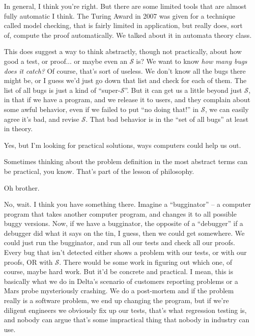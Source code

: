 \documentclass[sigplan]{acmart}
\begin{document}
   In general, I think you're right. But
there are some limited tools that are almost fully automatic I think.
The Turing Award in 2007 was given for a technique called model
checking, that is fairly limited in application, but really does, sort of,
compute the proof automatically.  We talked about it in automata
theory class.

  This does suggest a way to think
abstractly, though not practically, about how good a test, or proof...
or maybe even an $\mathcal{S}$ is?  We want to know \emph{how many bugs does
  it catch?}  Of course, that's sort of useless.  We don't know all
the bugs there might be, or I guess we'd just go down that list and
check for each of them.  The list of all bugs is just a kind of ``super-$\mathcal{S}$''.  But it can get us a little beyond just
$\mathcal{S}$, in that if we have a program, and we release it to
users, and they complain about some awful behavior, even if we failed
to put ``no doing that!'' in $\mathcal{S}$, we can easily agree it's
bad, and revise $\mathcal{S}$.  That bad behavior is in the ``set of
all bugs'' at least in theory.

  Yes, but I'm looking for practical
solutions, ways computers could help us out.

  Sometimes thinking about the problem
definition in the most abstract terms can be practical, you know.
That's part of the lesson of philosophy.

  Oh brother.

  No, wait.  I think you have something
there.  Imagine a ``bugginator'' -- a computer program that takes
another computer program, and changes it to all possible buggy
versions.  Now, if we have a bugginator, the opposite of a
``debugger'' if a debugger did what it says on the tin, I guess, then
we could get somewhere.  We could just run the bugginator, and run all
our tests and check all our proofs.  Every bug that isn't detected
either shows a problem with our tests, or with our proofs, OR with
$\mathcal{S}$.  There would be some work in figuring out which one, of
course, maybe hard work.  But it'd be concrete and practical.  I mean,
this is basically what we do in Delta's scenario of customers
reporting problems or a Mars probe mysteriously crashing.  We do a
post-mortem and if the problem really is a software problem, we end up
changing the program, but if we're diligent engineers we obviously fix
up our tests, that's what regression testing is, and nobody can argue
that's some impractical thing that nobody in industry can use.
\end{document}
